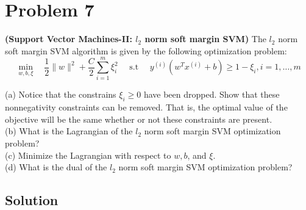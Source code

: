 \section*{Problem 7}

\textbf{(Support Vector Machines-II: \( l_{2}
    \) norm soft margin SVM)}
The \( l_{2} \) norm soft margin SVM algorithm is given by the following optimization problem:
\[
    \min _{w, b, \xi} \quad \frac{1}{2}\|w\|^{2}+\frac{C}{2} \sum_{i=1}^{m} \xi_{i}^{2} \quad \text { s.t } \quad y^{(i)}\left(w^{T} x^{(i)}+b\right) \geq 1-\xi_{i}, i=1, \ldots, m
\]

(a) Notice that the constrains \( \xi_{i} \geq 0 \) have been dropped. Show that these nonnegativity constraints can be removed. That is, the optimal value of the objective will be the same whether or not these constraints are present.\\
(b) What is the Lagrangian of the \( l_{2} \) norm soft margin SVM optimization problem?\\
(c) Minimize the Lagrangian with respect to \( w, b \), and \( \xi \).\\
(d) What is the dual of the \( l_{2} \) norm soft margin SVM optimization problem?

\subsection*{Solution}
